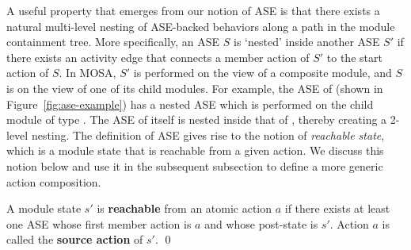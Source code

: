 {A useful property that emerges from our notion of ASE is that there exists a natural multi-level nesting of ASE-backed behaviors along a path in the module containment tree. More specifically, an ASE $S$ is `nested' inside another ASE $S'$ if there exists an activity edge that connects a member action of $S'$ to the start action of $S$. In MOSA, $S'$ is performed on the view of a composite module, and $S$ is on the view of one of its child modules.
%
For example, the ASE of  (shown in Figure~\ref{fig:ase-example}) has a nested ASE which is performed on the child module of type . The ASE of  itself is nested inside that of , thereby creating a 2-level nesting.
The definition of ASE gives rise to the notion of \textit{reachable state}, which is a module state that is reachable from a given action. We discuss this notion below and use it in the subsequent subsection to define a more generic action composition.
%
\begin{definition} \label{def:reachable-state}
A module state $s'$ is \textbf{reachable} from an atomic action $a$ if there exists at least one ASE whose first member action is $a$ and whose post-state is $s'$. Action $a$ is called the \textbf{source action} of $s'$. \qed
\end{definition}

%

}
